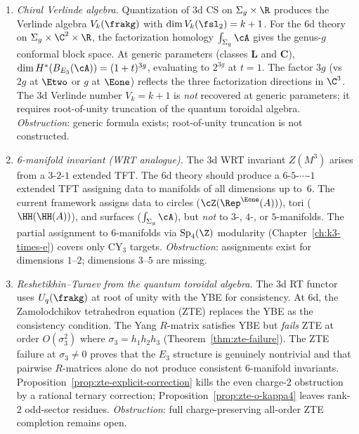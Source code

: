 \begin{conjecture}
\begin{enumerate}[label=\textup{(\roman*)}]
 \item \emph{Chiral Verlinde algebra.}
 Quantization of 3d CS on $\Sigma_g \times \R$ produces the Verlinde algebra $V_k(\frakg)$ with $\dim V_k(\fsl_2) = k + 1$. For the 6d theory on $\Sigma_g \times \C^2 \times \R$, the factorization homology $\int_{\Sigma_g} \cA$ gives the genus-$g$ conformal block space. At generic parameters (classes $\mathbf{L}$ and $\mathbf{C}$), $\dim H^*(B_{E_3}(\cA)) = (1+t)^{3g}$, evaluating to $2^{3g}$ at $t = 1$. The factor $3g$ (vs $2g$ at $\Etwo$ or $g$ at $\Eone$) reflects the three factorization directions in $\C^3$. The 3d Verlinde number $V_k = k + 1$ is \emph{not} recovered at generic parameters; it requires root-of-unity truncation of the quantum toroidal algebra.
 \emph{Obstruction}: generic formula exists; root-of-unity truncation is not constructed.

 \item \emph{6-manifold invariant (WRT analogue).}
 The 3d WRT invariant $Z(M^3)$ arises from a $3$-$2$-$1$ extended TFT. The 6d theory should produce a $6$-$5$-$\cdots$-$1$ extended TFT assigning data to manifolds of all dimensions up to~$6$. The current framework assigns data to circles ($\cZ(\Rep^{\Eone}(A))$), tori ($\HH(\HH(A))$), and surfaces ($\int_{\Sigma_g} \cA$), but \emph{not} to $3$-, $4$-, or $5$-manifolds. The partial assignment to $6$-manifolds via $\mathrm{Sp}_4(\Z)$ modularity (Chapter~\ref{ch:k3-times-e}) covers only CY$_3$ targets.
 \emph{Obstruction}: assignments exist for dimensions $1$--$2$; dimensions $3$--$5$ are missing.

 \item \emph{Reshetikhin--Turaev from the quantum toroidal algebra.}
 The 3d RT functor uses $U_q(\frakg)$ at root of unity with the YBE for consistency. At 6d, the Zamolodchikov tetrahedron equation (ZTE) replaces the YBE as the consistency condition. The Yang $R$-matrix satisfies YBE but \emph{fails} ZTE at order $O(\sigma_3^2)$ where $\sigma_3 = h_1 h_2 h_3$ (Theorem~\ref{thm:zte-failure}). The ZTE failure at $\sigma_3 \neq 0$ proves that the $E_3$ structure is genuinely nontrivial and that pairwise $R$-matrices alone do not produce consistent $6$-manifold invariants. Proposition~\ref{prop:zte-explicit-correction} kills the even charge-$2$ obstruction by a rational ternary correction; Proposition~\ref{prop:zte-o-kappa4} leaves rank-$2$ odd-sector residues.
 \emph{Obstruction}: full charge-preserving all-order ZTE completion remains open.
\end{enumerate}
\end{conjecture}

